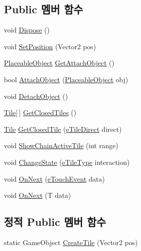 \subsection*{Public 멤버 함수}
\begin{DoxyCompactItemize}
\item 
void \hyperlink{class_tile_a6e8a801e95a29156cbf32024e45c6596}{Dispose} ()
\item 
void \hyperlink{class_tile_a4d7a81b36513066aad741ed675164690}{Set\+Position} (Vector2 pos)
\item 
\hyperlink{class_placeable_object}{Placeable\+Object} \hyperlink{class_tile_a02150b69b975e8e9de1c3e10070a8dda}{Get\+Attach\+Object} ()
\item 
bool \hyperlink{class_tile_a1969ee41c320c6e7748a33374942e07e}{Attach\+Object} (\hyperlink{class_placeable_object}{Placeable\+Object} obj)
\item 
void \hyperlink{class_tile_ab8ab187ab674cfb222f761feac3b20b3}{Detach\+Object} ()
\item 
\hyperlink{class_tile}{Tile}\mbox{[}$\,$\mbox{]} \hyperlink{class_tile_a38b9f5c215f16448118e83e0d10aed05}{Get\+Closed\+Tiles} ()
\item 
\hyperlink{class_tile}{Tile} \hyperlink{class_tile_a838aaa6a94321629d04e944ed3bf8b9f}{Get\+Closed\+Tile} (\hyperlink{_tile_8cs_a082f743a62d2d8e13dac8fd38af246d7}{e\+Tile\+Direct} direct)
\item 
void \hyperlink{class_tile_a0ca6f4d1ddb0e7609749f1cf583b3c16}{Show\+Chain\+Active\+Tile} (int range)
\item 
void \hyperlink{class_tile_a2bb5c747e9483b803ea65b4341ce5af6}{Change\+State} (\hyperlink{_tile_8cs_a271bc07be325bca511bcb747e0ff2fda}{e\+Tile\+Type} interaction)
\item 
void \hyperlink{class_tile_afdb21c9f57ecd9953edfd92d8541f8a3}{On\+Next} (\hyperlink{_touch_manager_8cs_ae33e321a424fe84ba8b2fdb81ad40a68}{e\+Touch\+Event} data)
\item 
void \hyperlink{interface_m_c_n_1_1_i_observer_a2f934b71aa4ddf6f936670d32c3cdff7}{On\+Next} (T data)
\end{DoxyCompactItemize}
\subsection*{정적 Public 멤버 함수}
\begin{DoxyCompactItemize}
\item 
static Game\+Object \hyperlink{class_tile_aec3cdb55a67f4c12d3056355c15bdba2}{Create\+Tile} (Vector2 pos)
\end{DoxyCompactItemize}
